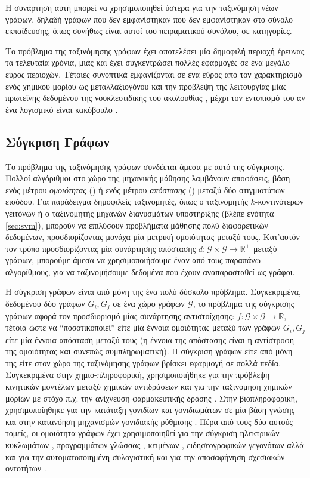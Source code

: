 Η συνάρτηση αυτή μπορεί να χρησιμοποιηθεί ύστερα για την ταξινόμηση νέων γράφων, δηλαδή γράφων που δεν εμφανίστηκαν που δεν εμφανίστηκαν στο σύνολο εκπαίδευσης, όπως συνήθως είναι αυτοί του πειραματικού συνόλου, σε κατηγορίες.\par
Το πρόβλημα της ταξινόμησης γράφων έχει αποτελέσει μία δημοφιλή περιοχή έρευνας τα τελευταία χρόνια, μιάς και έχει συγκεντρώσει πολλές εφαρμογές σε ένα μεγάλο εύρος περιοχών.
Τέτοιες συνοπτικά εμφανίζονται σε ένα εύρος από τον χαρακτηρισμό ενός χημικού μορίου ως μεταλλαξιογόνου \cite{Swamidass2005} και την πρόβλεψη της λειτουργίας μίας πρωτεΐνης δεδομένου της νουκλεοτιδικής του ακολουθίας \cite{Borgwardt2005}, μέχρι τον εντοπισμό του αν ένα λογισμικό είναι κακόβουλο \cite{Wagner2009}.
\subsection{Σύγκριση Γράφων}
Το πρόβλημα της ταξινόμησης γράφων συνδέεται άμεσα με αυτό της σύγκρισης.
Πολλοί αλγόριθμοι στο χώρο της μηχανικής μάθησης λαμβάνουν αποφάσεις, βάση ενός μέτρου \textit{ομοιότητας} () ή ενός μέτρου \textit{απόστασης} () μεταξύ δύο στιγμιοτύπων εισόδου.
Για παράδειγμα δημοφιλείς ταξινομητές, όπως ο ταξινομητής $k$-κοντινότερων γειτόνων ή ο ταξινομητής μηχανών διανυσμάτων υποστήριξης (βλέπε ενότητα \ref{sec:svm}), μπορούν να επιλύσουν προβλήματα μάθησης πολύ διαφορετικών δεδομένων, προσδιορίζοντας μονάχα μία μετρική ομοιότητας μεταξύ τους.
Κατ'αυτόν τον τρόπο προσδιορίζοντας μία συνάρτησης απόστασης $d : \mathcal{G} \times \mathcal{G} \rightarrow \mathbb{R}^{+}$ μεταξύ γράφων, μπορούμε άμεσα να χρησιμοποιήσουμε έναν από τους παραπάνω αλγορίθμους, για να ταξινομήσουμε δεδομένα που έχουν αναπαρασταθεί ως γράφοι.\par
Η σύγκριση γράφων είναι από μόνη της ένα πολύ δύσκολο πρόβλημα.
Συγκεκριμένα, δεδομένου δύο γράφων $G_{i}, G_{j}$ σε ένα χώρο γράφων $\mathcal{G}$, το πρόβλημα της σύγκρισης γράφων αφορά τον προσδιορισμό μίας συνάρτησης αντιστοίχησης: $f: \mathcal{G} \times \mathcal{G} \rightarrow \mathbb{R}$, τέτοια ώστε να ``ποσοτικοποιεί'' είτε μία έννοια ομοιότητας μεταξύ των γράφων $G_{i}, G_{j}$ είτε μία έννοια απόσταση μεταξύ τους (η έννοια της απόστασης είναι η αντίστροφη της ομοιότητας και συνεπώς συμπληρωματική).
Η σύγκριση γράφων είτε από μόνη της είτε στον χώρο της ταξινόμησης γράφων βρίσκει εφαρμογή σε πολλά πεδία.
Συγκεκριμένα στην χημιο-πληροφορική, χρησιμοποιήθηκε για την πρόβλεψη κινητικών μοντέλων μεταξύ χημικών αντιδράσεων \cite{Genesys} και για την ταξινόμηση χημικών μορίων με στόχο π.χ. την ανίχνευση φαρμακευτικής δράσης \cite{Wale2008}.
Στην βιοπληροφορική, χρησιμοποίηθηκε για την κατάταξη γονιδίων και γονιδιωμάτων σε μία βάση γνώσης\cite{KEGG, Hattori2003} και στην κατανόηση μηχανισμών γονιδιακής ρύθμισης \cite{Davidson1669}.
Πέρα από τους δύο αυτούς τομείς, οι ομοιότητα γράφων έχει χρησιμοποιηθεί για την σύγκριση ηλεκτρικών κυκλωμάτων \cite{Takashima1988}, προγραμμάτων γλώσσας  \cite{Gitchell1999}, κειμένων \cite{Rousseau2015TextCA}, ειδησεογραφικών γεγονότων \cite{Glavas2013} αλλά και για την αυτοματοποιημένη συλογιστική \cite{Tsivtsivadze2011} και για την αποσαφήνηση σχεσιακών οντοτήτων \cite{Hermansson2013EntityDI}.
